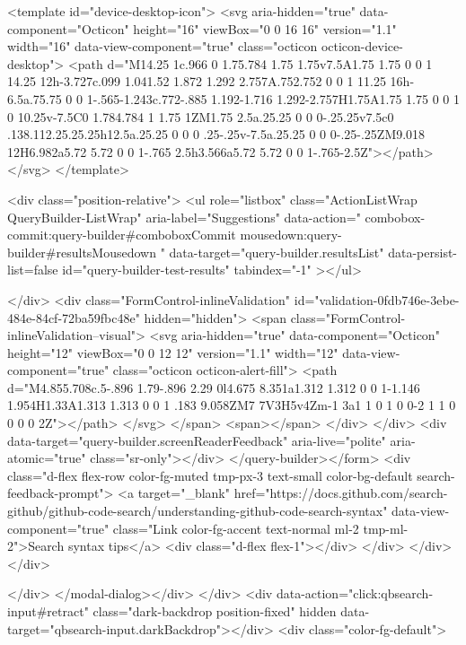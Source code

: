 <template id="device-desktop-icon">
  <svg aria-hidden="true" data-component="Octicon" height="16" viewBox="0 0 16 16" version="1.1" width="16" data-view-component="true" class="octicon octicon-device-desktop">
    <path d="M14.25 1c.966 0 1.75.784 1.75 1.75v7.5A1.75 1.75 0 0 1 14.25 12h-3.727c.099 1.041.52 1.872 1.292 2.757A.752.752 0 0 1 11.25 16h-6.5a.75.75 0 0 1-.565-1.243c.772-.885 1.192-1.716 1.292-2.757H1.75A1.75 1.75 0 0 1 0 10.25v-7.5C0 1.784.784 1 1.75 1ZM1.75 2.5a.25.25 0 0 0-.25.25v7.5c0 .138.112.25.25.25h12.5a.25.25 0 0 0 .25-.25v-7.5a.25.25 0 0 0-.25-.25ZM9.018 12H6.982a5.72 5.72 0 0 1-.765 2.5h3.566a5.72 5.72 0 0 1-.765-2.5Z"></path>
</svg>
</template>

        <div class="position-relative">
                        <ul
              role="listbox"
              class="ActionListWrap QueryBuilder-ListWrap"
              aria-label="Suggestions"
              data-action="
                combobox-commit:query-builder#comboboxCommit
                mousedown:query-builder#resultsMousedown
              "
              data-target="query-builder.resultsList"
              data-persist-list=false
              id="query-builder-test-results"
              tabindex="-1"
            ></ul>

        </div>
      <div class="FormControl-inlineValidation" id="validation-0fdb746e-3ebe-484e-84cf-72ba59fbc48e" hidden="hidden">
        <span class="FormControl-inlineValidation--visual">
          <svg aria-hidden="true" data-component="Octicon" height="12" viewBox="0 0 12 12" version="1.1" width="12" data-view-component="true" class="octicon octicon-alert-fill">
    <path d="M4.855.708c.5-.896 1.79-.896 2.29 0l4.675 8.351a1.312 1.312 0 0 1-1.146 1.954H1.33A1.313 1.313 0 0 1 .183 9.058ZM7 7V3H5v4Zm-1 3a1 1 0 1 0 0-2 1 1 0 0 0 0 2Z"></path>
</svg>
        </span>
        <span></span>
</div>    </div>
    <div data-target="query-builder.screenReaderFeedback" aria-live="polite" aria-atomic="true" class="sr-only"></div>
</query-builder></form>
          <div class="d-flex flex-row color-fg-muted tmp-px-3 text-small color-bg-default search-feedback-prompt">
            <a target="_blank" href="https://docs.github.com/search-github/github-code-search/understanding-github-code-search-syntax" data-view-component="true" class="Link color-fg-accent text-normal ml-2 tmp-ml-2">Search syntax tips</a>            <div class="d-flex flex-1"></div>
          </div>
        </div>
</div>

    </div>
</modal-dialog></div>
  </div>
  <div data-action="click:qbsearch-input#retract" class="dark-backdrop position-fixed" hidden data-target="qbsearch-input.darkBackdrop"></div>
  <div class="color-fg-default">
    

